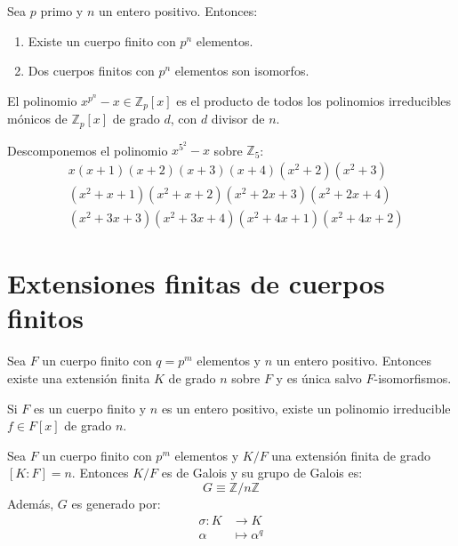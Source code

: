 \begin{corollary}
    Sea $p$ primo y $n$ un entero positivo. Entonces:
    \begin{enumerate}
        \item Existe un cuerpo finito con $p^n$ elementos.
        \item Dos cuerpos finitos con $p^n$ elementos son isomorfos.
    \end{enumerate}
\end{corollary}

\begin{corollary}
    El polinomio $x^{p^n}-x \in \mathbb{Z}_p[x]$ es el producto de todos los polinomios irreducibles mónicos de $\mathbb{Z}_p[x]$ de grado $d$, con $d$ divisor de $n$.
\end{corollary}

\begin{example}
    Descomponemos el polinomio $x^{5^2} - x$ sobre $\mathbb{Z}_5$:
    \begin{align*}
         & x(x+1)(x+2)(x+3)(x+4)(x^2+2)(x^2+3)      \\
         & (x^2+x+1)(x^2+x+2)(x^2+2x+3)(x^2+2x+4)   \\
         & (x^2+3x+3)(x^2+3x+4)(x^2+4x+1)(x^2+4x+2)
    \end{align*}
\end{example}

\section{Extensiones finitas de cuerpos finitos}

\begin{proposition}
    Sea $F$ un cuerpo finito con $q = p^m$ elementos y $n$ un entero positivo.
    Entonces existe una extensión finita $K$ de grado $n$ sobre $F$ y es única salvo $F$-isomorfismos.
\end{proposition}

\begin{corollary}
    Si $F$ es un cuerpo finito y $n$ es un entero positivo, existe un polinomio irreducible $f \in F[x]$ de grado $n$.
\end{corollary}

\begin{theorem}
    Sea $F$ un cuerpo finito con $p^m$ elementos y $K/F$ una extensión finita de grado $[K : F] = n$.
    Entonces $K/F$ es de Galois y su grupo de Galois es:
    $$G \equiv \mathbb{Z}/n\mathbb{Z}$$
    Además, $G$ es generado por:
    \begin{align*}
        \sigma : K & \to K            \\
        \alpha     & \mapsto \alpha^q
    \end{align*}
\end{theorem}